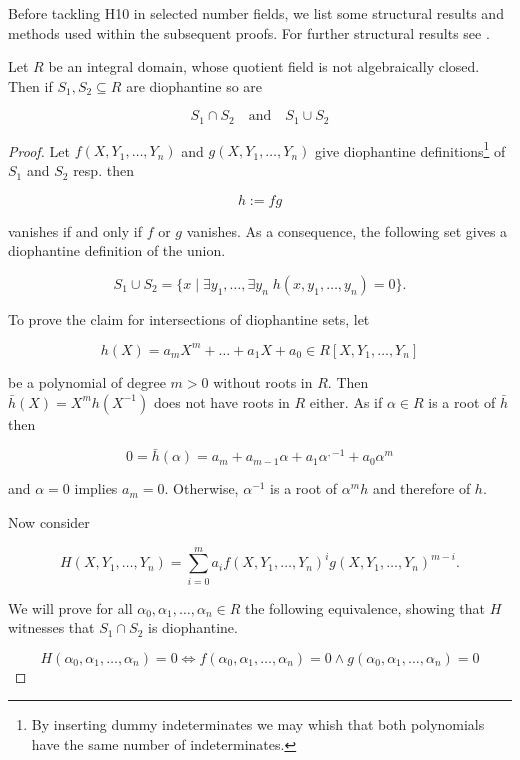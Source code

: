 
Before tackling \textsc{H10} in selected number fields, we list some
structural results and methods used within the subsequent proofs. For
further structural results see \cite{Shlapentokh2000}.

\begin{lem}\label{lem:intersections and unions}
    Let $R$ be an integral domain, whose quotient field is not
    algebraically closed. Then if $S_1, S_2 \subseteq R$ are diophantine so are
    
    \[ S_1 ∩ S_2 \quad \text{and} \quad S_1 ∪ S_2 \]
\end{lem}

\begin{proof}
Let $f(X, Y_1, …, Y_n)$ and $g(X, Y_1, …, Y_n)$ give diophantine
definitions\footnote{By inserting dummy indeterminates we may whish that
both polynomials have the same number of indeterminates.} of $S_1$
and $S_2$ resp. then

\[ h := fg \]

vanishes if and only if $f$ or $g$ vanishes. As a consequence, the
following set gives a diophantine definition of the union.

\[ S_1 ∪ S_2 = \lbrace x \mid ∃ y_1, … , ∃ y_n \; h(x, y_1, … , y_n) = 0 \rbrace. \]

To prove the claim for intersections of diophantine sets, let

\[h(X) = a_m X^m + … + a_1 X + a_0 ∈ R[X, Y_1, …, Y_n]\]

be a polynomial of degree $m > 0$ without roots in $R$. Then
$\bar h(X) = X^m h(X^{-1})$ does not have roots in $R$ either. As if
$α ∈ R$ is a root of $\bar h$ then

\[ 0 = \bar h(α) = a_m + a_{m-1} α + a_1 α^{,-1} + a_0 α^m\]

and $α = 0$ implies $a_m = 0$. Otherwise, $α^{-1}$ is a root of
$α^m h$ and therefore of $h$.

Now consider

\[ H(X, Y_1, …, Y_n) = \sum_{i=0}^m a_i f(X, Y_1, …, Y_n)^i g(X, Y_1, …, Y_n)^{m - i}.\]

We will prove for all $α_0, α_1, …, α_n ∈ R$ the following
equivalence, showing that $H$ witnesses that $S_1 ∩ S_2$ is
diophantine.

\[ H(α_0, α_1, …, α_n) = 0 \Leftrightarrow f(α_0, α_1, …, α_n) = 0 ∧ g(α_0, α_1, …, α_n) = 0 \]


\end{proof}
